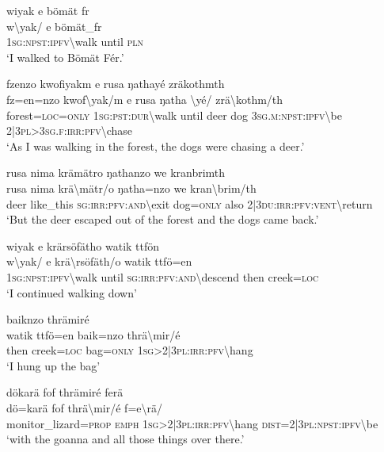 \ea\label{ex:13:a1332}
wiyak e bömät fr\\
\gll w{\textbackslash}yak/	e	bömät\_fr\\
     1\textsc{sg}:\textsc{npst}:\textsc{ipfv}{\textbackslash}walk	until	\textsc{pln}\\
\glt `I walked to Bömät Fér.'
\z

\ea\label{ex:13:a1333}
fzenzo kwofiyakm e rusa ŋathayé zräkothmth\\
\gll fz=en=nzo	kwof{\textbackslash}yak/m	e	rusa	ŋatha	{\textbackslash}yé/	zrä{\textbackslash}kothm/th\\
     forest=\textsc{loc}=\textsc{only}	1\textsc{sg}:\textsc{pst}:\textsc{dur}{\textbackslash}walk	until	deer	dog	3\textsc{sg}.\textsc{m}:\textsc{npst}:\textsc{ipfv}{\textbackslash}be	2|3\textsc{pl}>3\textsc{sg}.\textsc{f}:\textsc{irr}:\textsc{pfv}{\textbackslash}chase\\
\glt `As I was walking in the forest, the dogs were chasing a deer.'
\z

\newpage
\ea\label{ex:13:a1334}
rusa nima krämätro ŋathanzo we kranbrimth\\
\gll rusa	nima	krä{\textbackslash}mätr/o	ŋatha=nzo	we	kran{\textbackslash}brim/th\\
     deer	like\_this	\textsc{sg}:\textsc{irr}:\textsc{pfv}:\textsc{and}{\textbackslash}exit	dog=\textsc{only}	also	2|3\textsc{du}:\textsc{irr}:\textsc{pfv}:\textsc{vent}{\textbackslash}return\\
\glt `But the deer escaped out of the forest and the dogs came back.'
\z

\ea\label{ex:13:a1335}
wiyak e krärsöfätho watik ttfön\\
\gll w{\textbackslash}yak/	e	krä{\textbackslash}rsöfäth/o	watik	ttfö=en\\
     1\textsc{sg}:\textsc{npst}:\textsc{ipfv}{\textbackslash}walk	until	\textsc{sg}:\textsc{irr}:\textsc{pfv}:\textsc{and}{\textbackslash}descend	then	creek=\textsc{loc}\\
\glt `I continued walking down'
\z

\ea\label{ex:13:a1336}
baiknzo thrämiré\\
\gll watik	ttfö=en	baik=nzo	thrä{\textbackslash}mir/é\\
     then	creek=\textsc{loc}	bag=\textsc{only}	1\textsc{sg}>2|3\textsc{pl}:\textsc{irr}:\textsc{pfv}{\textbackslash}hang\\
\glt `I hung up the bag'
\z

\ea\label{ex:13:a1337}
dökarä fof thrämiré ferä\\
\gll dö=karä	fof	thrä{\textbackslash}mir/é	f=e{\textbackslash}rä/\\
     monitor\_lizard=\textsc{prop}	\textsc{emph}	1\textsc{sg}>2|3\textsc{pl}:\textsc{irr}:\textsc{pfv}{\textbackslash}hang	\textsc{dist}=2|3\textsc{pl}:\textsc{npst}:\textsc{ipfv}{\textbackslash}be\\
\glt `with the goanna and all those things over there.'
\z

